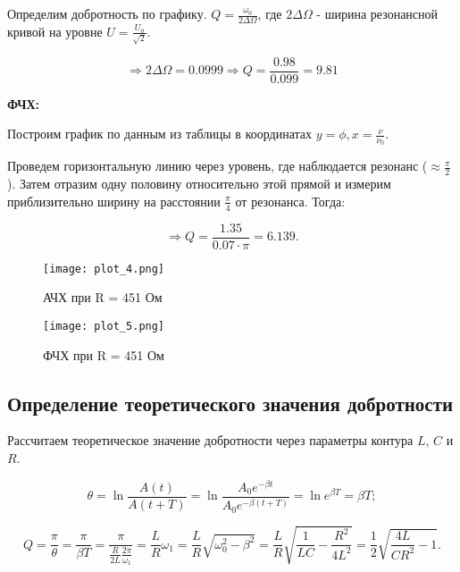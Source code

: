 \documentclass[a4paper,12pt]{article} %
\begin{document}
\begin{enumerate}
    Определим добротность по графику. $Q = \frac{\omega_0}{2\Delta \Omega}$, где $2\Delta \Omega$ - ширина резонансной кривой на уровне $U = \frac{U_0}{\sqrt{2}}$.

    \[ \Longrightarrow 2\Delta \Omega = 0.0999 \Longrightarrow Q = \frac{0.98}{0.099} = 9.81 \]

    \textbf{ФЧХ:}

    Построим график по данным из таблицы в координатах  $ y = \phi, x = \frac{\nu}{\nu_0}$. 


    Проведем горизонтальную линию через уровень, где наблюдается резонанс ($\approx\frac{\pi}{2}$). Затем отразим одну половину относительно этой прямой и измерим приблизительно ширину на расстоянии $\frac{\pi}{4}$ от резонанса. Тогда:

    \[ \Longrightarrow Q = \frac{1.35}{0.07\cdot \pi} = 6.139. \]
    
\end{enumerate}

\begin{figure}[h]
    \begin{center}
		\texttt{[image: plot\_4.png]}
    \end{center}
	\caption{АЧХ при R = 451 Ом}
	\label{plot4}
    \end{figure}

\begin{figure}[h]
    \begin{center}
		\texttt{[image: plot\_5.png]}
    \end{center}
	\caption{ФЧХ при R = 451 Ом}
	\label{plot5}
    \end{figure}

\newpage

\subsection{Определение теоретического значения добротности}

    Рассчитаем теоретическое значение добротности через параметры контура $L$, $C$ и $R$.

    \[ \theta = \ln{\frac{A(t)}{A(t+T)}} = \ln{\frac{A_0e^{-\beta t}}{A_0e^{-\beta(t+T)}}} = \ln{e^{\beta T}} = \beta T; \]

    \[Q = \frac{\pi}{\theta} = \frac{\pi}{\beta T} = \frac{\pi}{\frac{R}{2L}\frac{2\pi}{\omega_1}} = \frac{L}{R}\omega_1 = \frac{L}{R}\sqrt{\omega_0^2 - \beta^2} = \frac{L}{R}\sqrt{\frac{1}{LC} - \frac{R^2}{4L^2}} = \frac{1}{2}\sqrt{\frac{4L}{CR^2} - 1}. \]
\end{document}
